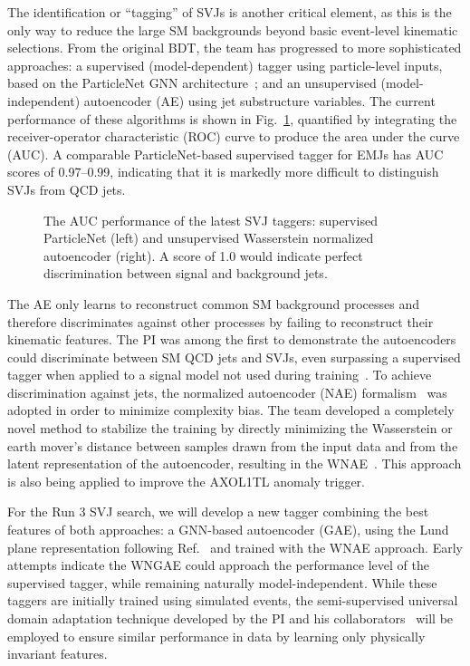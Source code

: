 The identification or ``tagging'' of SVJs is another critical element, as this is the only way to reduce the large SM backgrounds beyond basic event-level kinematic selections.
From the original BDT, the team has progressed to more sophisticated approaches:
a supervised (model-dependent) tagger using particle-level inputs, based on the ParticleNet GNN architecture~\cite{Qu:2019gqs};
and an unsupervised (model-independent) autoencoder (AE) using jet substructure variables.
The current performance of these algorithms is shown in Fig.~\ref{fig:svjtaggers}, quantified by integrating the receiver-operator characteristic (ROC) curve to produce the area under the curve (AUC).
A comparable ParticleNet-based supervised tagger for EMJs has AUC scores of 0.97--0.99, indicating that it is markedly more difficult to distinguish SVJs from QCD jets.

\begin{figure}[htb!]
\centering
{}
\caption{The AUC performance of the latest SVJ taggers: supervised ParticleNet (left) and unsupervised Wasserstein normalized autoencoder (right).
A score of 1.0 would indicate perfect discrimination between signal and background jets.}
\label{fig:svjtaggers}
\end{figure}

The AE only learns to reconstruct common SM background processes and therefore discriminates against other processes by failing to reconstruct their kinematic features.
The PI was among the first to demonstrate the autoencoders could discriminate between SM QCD jets and SVJs, even surpassing a supervised tagger when applied to a signal model not used during training~\cite{Canelli:2021aps}.
To achieve discrimination against \ttbar jets, the normalized autoencoder (NAE) formalism~\cite{Dillon:2022mkq} was adopted in order to minimize complexity bias.
The team developed a completely novel method to stabilize the training by directly minimizing the Wasserstein or earth mover's distance
between samples drawn from the input data and from the latent representation of the autoencoder, resulting in the WNAE~\cite{Eble:2024tpr}.
This approach is also being applied to improve the AXOL1TL anomaly trigger.

For the Run 3 SVJ search, we will develop a new tagger combining the best features of both approaches:
a GNN-based autoencoder (GAE), using the Lund plane representation following Ref.~\cite{Dreyer:2020brq} and trained with the WNAE approach.
Early attempts indicate the WNGAE could approach the performance level of the supervised tagger, while remaining naturally model-independent.
While these taggers are initially trained using simulated events,
the semi-supervised universal domain adaptation technique developed by the PI and his collaborators~\cite{Ciprijanovic:2023hrw}
will be employed to ensure similar performance in data by learning only physically invariant features.

